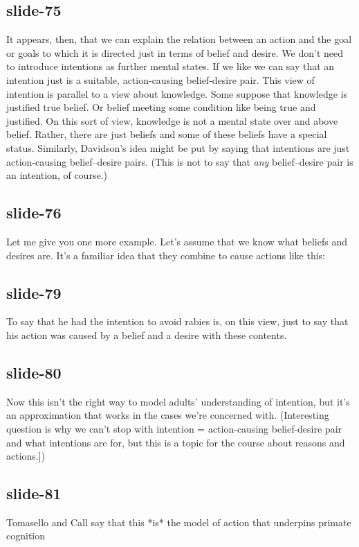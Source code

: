 \documentclass[12pt,\papersize]{extarticle}
\begin{document}
\subsection{slide-75}
It appears, then, that we can explain the relation between an action and the goal or goals to which it is directed just in terms of belief and desire.
We don't need to introduce intentions as further mental states.
If we like we can say that an intention just is a suitable, action-causing belief-desire pair.
This view of intention is parallel to a view about knowledge.
Some suppose that knowledge is justified true belief.
Or belief meeting some condition like being true and justified.
On this sort of view, knowledge is not a mental state over and above belief.
Rather, there are just beliefs and some of these beliefs have a special status.
Similarly, Davidson's idea might be put by saying that intentions are just action-causing belief--desire pairs.
(This is not to say that \emph{any} belief--desire pair is an intention, of course.)
 
 
\subsection{slide-76}
Let me give you one more example.
Let's assume that we know what beliefs and desires are.
It's a familiar idea that they combine to cause actions like this:
 
 
\subsection{slide-79}
To say that he had the intention to avoid rabies is, on this view, just to say that his action was caused by a belief and a desire with these contents.
 
 
\subsection{slide-80}
Now this isn't the right way to model adults' understanding of intention, but it's an approximation that works in the cases we're concerned with.
(Interesting question is why we can’t stop with intention = action-causing belief-desire pair and what intentions are for, but this is a topic for the course about reasons and actions.])
 
 
\subsection{slide-81}
Tomasello and Call say that this *is* the model of action that underpins primate cognition
 
\end{document}
